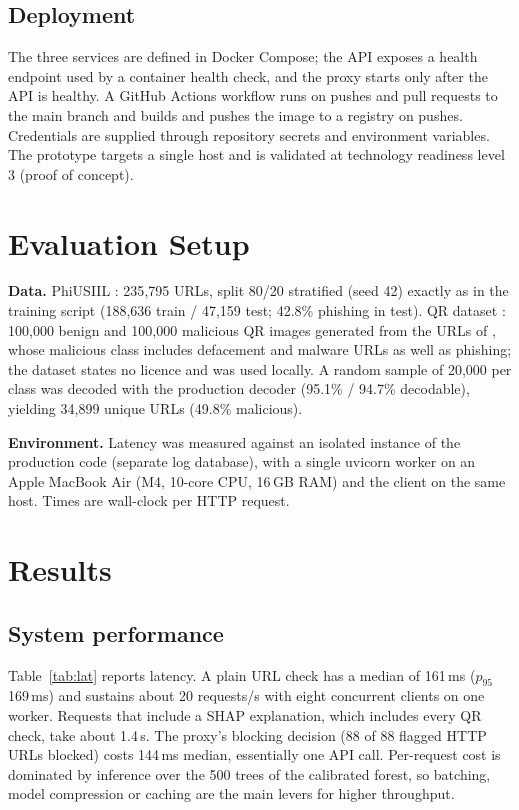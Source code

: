 \documentclass[conference]{IEEEtran}
\begin{document}
\subsection{Deployment}
The three services are defined in Docker Compose; the API exposes a health endpoint used by a container health check, and the proxy starts only after the API is healthy. A GitHub Actions workflow runs on pushes and pull requests to the main branch and builds and pushes the image to a registry on pushes. Credentials are supplied through repository secrets and environment variables. The prototype targets a single host and is validated at technology readiness level 3 (proof of concept).

\section{Evaluation Setup}
\textbf{Data.} PhiUSIIL \cite{phiusiil}: 235{,}795 URLs, split 80/20 stratified (seed 42) exactly as in the training script (188{,}636 train / 47{,}159 test; 42.8\% phishing in test). QR dataset \cite{malibariqr}: 100{,}000 benign and 100{,}000 malicious QR images generated from the URLs of \cite{malibariurl}, whose malicious class includes defacement and malware URLs as well as phishing; the dataset states no licence and was used locally. A random sample of 20{,}000 per class was decoded with the production decoder (95.1\% / 94.7\% decodable), yielding 34{,}899 unique URLs (49.8\% malicious).

\textbf{Environment.} Latency was measured against an isolated instance of the production code (separate log database), with a single uvicorn worker on an Apple MacBook Air (M4, 10-core CPU, 16\,GB RAM) and the client on the same host. Times are wall-clock per HTTP request.

\section{Results}
\subsection{System performance}
Table~\ref{tab:lat} reports latency. A plain URL check has a median of 161\,ms ($p_{95}$ 169\,ms) and sustains about 20 requests/s with eight concurrent clients on one worker. Requests that include a SHAP explanation, which includes every QR check, take about 1.4\,s. The proxy's blocking decision (88 of 88 flagged HTTP URLs blocked) costs 144\,ms median, essentially one API call. Per-request cost is dominated by inference over the 500 trees of the calibrated forest, so batching, model compression or caching are the main levers for higher throughput.
\end{document}
